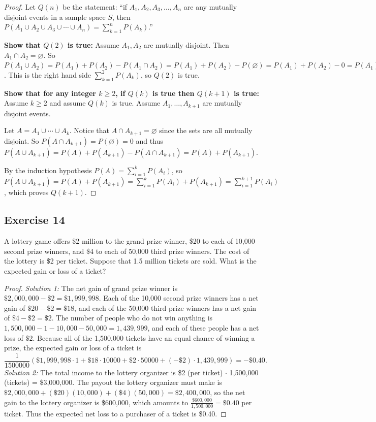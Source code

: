 \documentclass[14pt]{extarticle}
\newcommand{\es}{\varnothing}
\begin{document}
\begin{proof}
Let \(Q(n)\) be the statement: ``if \(A_1, A_2, A_3, \ldots, A_n\) are any mutually disjoint events in a sample space 
\(S\), then \(P(A_1 \cup A_2 \cup A_3 \cup \cdots \cup A_n) = \sum_{k=1}^n P(A_k)\).''

{\bf Show that \(Q(2)\) is true:} Assume \(A_1, A_2\) are mutually disjoint. Then \(A_1 \cap A_2 = \es\). So
\(P(A_1 \cup A_2) = P(A_1) + P(A_2) - P(A_1 \cap A_2) = P(A_1) + P(A_2) - P(\es) = P(A_1) + P(A_2) - 0 = P(A_1) + P(A_2)\).
This is the right hand side \(\sum_{k=1}^2 P(A_k)\), so \(Q(2)\) is true.

{\bf Show that for any integer \(k \geq 2\), if \(Q(k)\) is true then \(Q(k+1)\) is true:} Assume \(k \geq 2\) and assume
\(Q(k)\) is true. Assume \(A_1, \ldots, A_{k+1}\) are mutually disjoint events.

Let \(A = A_1 \cup \cdots \cup A_k\). Notice that \(A \cap A_{k+1} = \es\) since the sets are all mutually disjoint. So 
\(P(A \cap A_{k+1})= P(\es) = 0\) and thus \(P(A \cup A_{k+1}) = P(A) + P(A_{k+1}) - P(A \cap A_{k+1}) = P(A) + P(A_{k+1})\).

By the induction hypothesis \(P(A) = \sum_{i=1}^k P(A_i)\), so \(P(A \cup A_{k+1}) = P(A) + P(A_{k+1}) = \sum_{i=1}^k P(A_i)
+ P(A_{k+1}) = \sum_{i=1}^{k+1} P(A_i)\), which proves \(Q(k+1)\).
\end{proof}

\subsection{Exercise 14}
A lottery game offers \$2 million to the grand prize winner, \$20 to each of 10,000 second prize winners, and \$4 to each of 
50,000 third prize winners. The cost of the lottery is \$2 per ticket. Suppose that 1.5 million tickets are sold. What is the 
expected gain or loss of a ticket?

\begin{proof}
{\it Solution 1:} The net gain of grand prize winner is \(\$2,000,000 - \$2 = \$1,999,998\). Each of the 10,000 second 
prize winners has a net gain of \(\$20 - \$2 = \$18\), and each of the 50,000 third prize winners has a net gain of \(\$4 
- \$2 = \$2\). The number of people who do not win anything is \(1,500,000 - 1 - 10,000 - 50,000 = 1,439,999\), and each of 
these people has a net loss of \(\$2\). Because all of the 1,500,000 tickets have an equal chance of winning a prize, the 
expected gain or loss of a ticket is 
\[ 
\frac{1}{1500000}(\$1,999,998 \cdot 1 + \$18 \cdot 10000 + \$2 \cdot 50000 + (-\$2) \cdot 1,439,999) = -\$0.40.
\]
{\it Solution 2:} The total income to the lottery organizer is \$2 (per ticket) \(\cdot\) 1,500,000 (tickets) = \$3,000,000. 
The payout the lottery organizer must make is \(\$2,000,000 + (\$20)(10,000) + (\$4)(50,000) = \$2,400,000\), so the net 
gain to the lottery organizer is \$600,000, which amounts to \(\frac{\$600,000}{1,500,000} = \$0.40\) per ticket. Thus the 
expected net loss to a purchaser of a ticket is \$0.40.
\end{proof}
\end{document}
